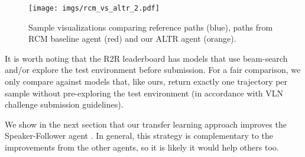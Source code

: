 \documentclass[10pt,twocolumn,letterpaper]{article}
\begin{document}
\begin{figure}
  \centering   
  \texttt{[image: imgs/rcm\_vs\_altr\_2.pdf]}

\caption{ 
    Sample visualizations comparing reference paths (blue), paths from RCM baseline agent (red) and our ALTR agent (orange).}
    \label{fig:sample_viz}
\end{figure}

It is worth noting that the R2R leaderboard has models that use beam-search and/or explore the test environment before submission. For a fair comparison, we only compare against models that, like ours, return exactly one trajectory per sample without pre-exploring the test environment (in accordance with VLN challenge submission guidelines).

We show in the next section that our transfer learning approach improves the Speaker-Follower agent \cite{Fried:2018:Speaker}. In general, this strategy is complementary to the improvements from the other agents, so it is likely it would help others too.
\end{document}
